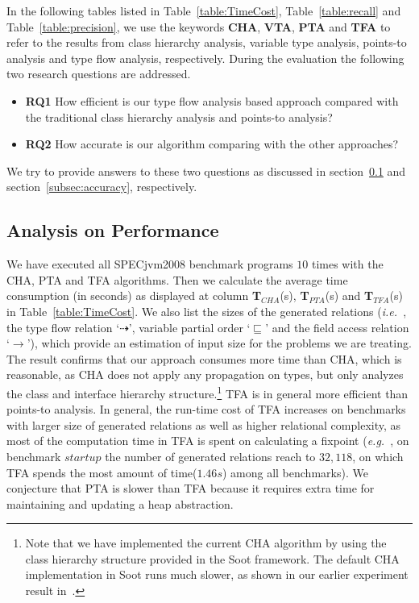 \documentclass{fac}
\newcommand\eg{\textit{e.g.\ }}
\newcommand\ie{\textit{i.e.\ }}
\newcommand{\less}{\sqsubseteq}
\newcommand{\tflow}{\dashrightarrow}
\newcommand{\hflow}{\longrightarrow}
\begin{document}
In the following tables listed in Table~\ref{table:TimeCost}, Table~\ref{table:recall} and Table~\ref{table:precision}, we use the keywords \textbf{CHA}, \textbf{VTA}, \textbf{PTA} and \textbf{TFA} to refer to the results from class hierarchy analysis, variable type analysis, points-to analysis and type flow analysis, respectively. During the evaluation the following two research questions are addressed. %
\begin{itemize}
\item \textbf{RQ1} How efficient is our type flow analysis based approach compared with the traditional class hierarchy analysis and points-to analysis?
\item \textbf{RQ2} How accurate is our algorithm comparing with the other approaches?
\end{itemize}
We try to provide answers to these two questions as discussed in section~\ref{subsec:efficiency} and section~\ref{subsec:accuracy}, respectively.

\subsection{Analysis on Performance}\label{subsec:efficiency}

We have executed all SPECjvm2008 benchmark programs $10$ times with the CHA, PTA and TFA algorithms. Then we calculate the average time consumption (in seconds) as displayed at column \textbf{T$_{CHA}$}(s), \textbf{T$_{PTA}$}(s) and \textbf{T$_{TFA}$}(s) in Table~\ref{table:TimeCost}. We also list the sizes of the generated relations (\ie, the type flow relation `$\tflow$', variable partial order `$\less$' and the field access relation `$\hflow$'), which provide an estimation of input size for the problems we are treating. The result confirms that our approach consumes more time than CHA, which is reasonable, as CHA does not apply any propagation on types, but only analyzes the class and interface hierarchy structure.\footnote{Note that we have implemented the current CHA algorithm by using the class hierarchy structure provided in the Soot framework. The default CHA implementation in Soot runs much slower, as shown in our earlier experiment result in~\cite{ZhuoZ19}.} TFA is in general more efficient than points-to analysis. In general, the run-time cost of TFA increases on benchmarks with larger size of generated relations as well as higher relational complexity, as most of the computation time in TFA is spent on calculating a fixpoint (\eg, on benchmark $startup$ the number of generated relations reach to $32,118$, on which TFA spends the most amount of time($1.46s$) among all benchmarks). We conjecture that PTA is slower than TFA because it requires extra time for maintaining and updating a heap abstraction.
\end{document}
